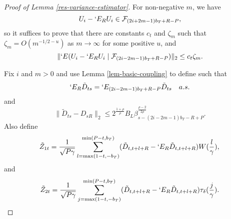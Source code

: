 \documentclass[11pt]{article}
\newcommand{\E}{`E}
\newcommand{\kernelB}[1]{\ensuremath{\tau_{\delta}(#1)}}
\newcommand{\vttLower}{\ensuremath{\max(1-t,-b_T)}}
\newcommand{\vttUpper}{\ensuremath{\min(P-t,b_T)}}
\newcommand{\couplingConstant}{\ensuremath{2^{\frac{1+\rho}{\rho}} B_L}}
\newcommand{\couplingBeta}[1]{\ensuremath{\beta^{\frac{\rho-2}{2\rho}}_{#1}}}
\newcommand{\couplingBound}[1]{\couplingConstant \couplingBeta{#1}}
\begin{document}
\begin{proof}[Proof of Lemma \ref{res-variance-estimator}]
For non-negative $m$, we have 
\begin{equation*}
U_i - \E_R U_i \in \UFiltration{2i+2m-1},
\end{equation*}
so it suffices to prove that there are constants $c_t$ and $\zeta_m$
such that $\zeta_m = O(m^{-1/2 - u})$ as $m \to \infty$ for some
positive $u$, and
\begin{equation*}
  \lVert \E( U_i - \E_R U_i \mid \UFiltration{2i-2m-1}) \rVert_2 \leq c_t \zeta_m.
\end{equation*}

Fix $i$ and $m > 0$ and use Lemma \ref{lem-basic-coupling} to define
such that 
\begin{equation*}
 \E_R \tilde D_{ts} = \E_{(2i-2m-1)b_T+R-P} \tilde D_{ts} \quad a.s.
\end{equation*}
and
\begin{equation*}
  \lVert \tilde D_{ts} - D_{sR} \rVert_2 \leq \couplingBound{s - (2i-2m-1)b_T-R+P}.
\end{equation*}
Also define
\begin{equation*}
  \tilde Z_{1t} = \frac1{\sqrt{P\gamma}} \sum_{l=\vttLower}^{\vttUpper}
  (\tilde D_{t,t+l+R} - \E_R\tilde D_{t,t+l+R}) W(\frac{l}{\gamma}), \\
\end{equation*}
and
\begin{equation*}
\tilde Z_{2t} = \frac1{\sqrt{P\gamma}} \sum_{j=\vttLower}^{\vttUpper}
    (\tilde D_{t,t+l+R} - \E_R\tilde D_{t,t+l+R})\kernelB{\frac{j}{\gamma}}.
\end{equation*}


\end{proof}
\end{document}
